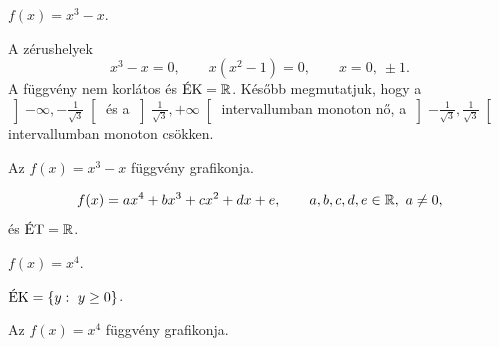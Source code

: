 \documentclass[11pt]{article}
\begin{document}
\begin{exbox}
\begin{example}
$f(x)=x^{3}-x$.
\end{example}
\end{exbox}
\begin{solution}
A zérushelyek
\[
x^{3}-x=0,\qquad x(x^{2}-1)=0,\qquad x=0,\ \pm 1 .
\]
A függvény nem korlátos és $\EK=\R$. Később megmutatjuk, hogy a
$\left]-\infty, -\tfrac{1}{\sqrt{3}}\right[$ és a
$\left]\tfrac{1}{\sqrt{3}}, +\infty\right[$ intervallumban monoton nő, a
$\left]-\tfrac{1}{\sqrt{3}}, \tfrac{1}{\sqrt{3}}\right[$ intervallumban monoton csökken.

\begin{notefig}{Az $f(x)=x^{3}-x$ függvény grafikonja.}
\end{notefig}
\end{solution}

\begin{defbox}
\begin{definition}
\[
f(x)=ax^{4}+bx^{3}+cx^{2}+dx+e,\qquad a, b, c, d, e\in\R,\ a\neq 0,
\]
és $\ET=\R$.
\end{definition}
\end{defbox}

\begin{exbox}
\begin{example}
$f(x)=x^{4}$.
\end{example}
\end{exbox}
\begin{solution}
$\EK=\{y:\ y\ge 0\}$.

\begin{notefig}{Az $f(x)=x^{4}$ függvény grafikonja.}
\end{notefig}
\end{solution}
\end{document}
